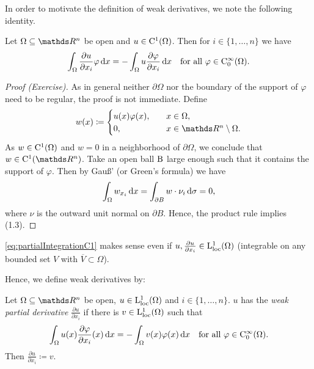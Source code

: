 In order to motivate the definition of weak derivatives, we note the following identity.

\begin{lem}
  \label{lem:partialIntegrationC1}
  Let $\Omega \subseteq \R^n$ be open and $u \in \mathrm{C}^1(\Omega)$. 
  Then for $i \in \{1,\dots,n\}$ we have
  \begin{equation}
    \label{eq:partialIntegrationC1}
    \int_\Omega \frac{\partial u}{\partial x_i} \varphi \, {\operatorname{d}\!{x}} = -\int_\Omega u \frac{\partial \varphi}{\partial x_i} \, {\operatorname{d}\!{x}} \quad \text{for all } \varphi \in \mathrm{C}_0^\infty(\Omega).
  \end{equation}
\end{lem}

\begin{proof}[Proof (Exercise)]
  As in general neither $\partial \Omega$ nor the boundary of the support of $\varphi$ need to be regular, the proof is not immediate.
  Define
  $$
  w(x) \coloneqq  \begin{cases} u(x) \varphi(x), \quad &x \in \Omega, \\
    0, \quad &x \in \R^n \setminus \Omega .\end{cases}
  $$
  As $w \in \mathrm{C}^1(\Omega)$ and $w = 0$ in a neighborhood of $\partial \Omega$, we conclude that $w \in \CC^1(\R^n)$.
  Take an open ball $\mathrm{B}$ large enough such that it contains the support of $\varphi$. 
  Then by Gauß' (or Green's formula) we have
  $$
  \int_\Omega w_{x_i} \, {\operatorname{d}\!{x}} 
  = \int_{\partial B} w \cdot \nu_i \, {\operatorname{d}\!{\sigma}} = 0,
  $$
  where $\nu$ is the outward unit normal on $\partial B$.
  Hence, the product rule implies (1.3).
\end{proof}
\eqref{eq:partialIntegrationC1} makes sense even if $u, \frac{\partial u}{\partial x_i} \in \mathrm{L}_{\operatorname{loc}}^1(\Omega)$ (integrable on any bounded set $V$ with $\overline V \subset \Omega$).

Hence, we define weak derivatives by:

\begin{defn}
  Let $\Omega \subseteq \R^n$ be open, $u \in \mathrm{L}_{\operatorname{loc}}^1(\Omega)$ and $i \in \{1,\dots,n\}$.
  $u$ has the \emph{weak partial derivative} $\frac{\partial u}{\partial x_i}$ if there is $v \in \mathrm{L}_{\operatorname{loc}}^1(\Omega)$ such that
  \begin{equation}
    \label{eq:weakDerivativeDef}
    \int_\Omega u(x) \frac{\partial \varphi}{\partial x_i}(x) \, {\operatorname{d}\!{x}} = -\int_\Omega v(x) \varphi(x) \, {\operatorname{d}\!{x}} \quad \text{for all } \varphi \in \mathrm{C}_0^\infty(\Omega).    
  \end{equation}
  Then $\frac{\partial u}{\partial x_i} \coloneqq v$.
\end{defn}

